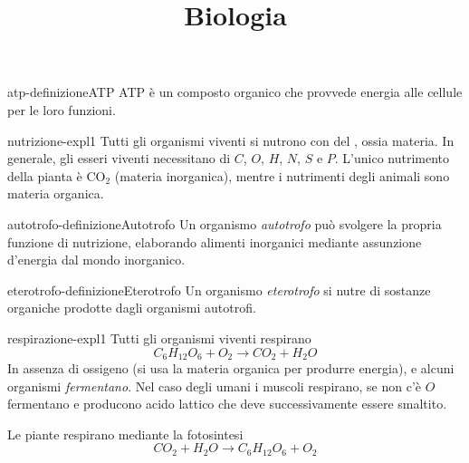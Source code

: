 \documentclass[preview]{standalone}
\begin{document}
\title{Biologia}
\genpage

\begin{snippetdefinition}{atp-definizione}{ATP}
    ATP è un composto organico che provvede energia alle cellule per le loro funzioni.
\end{snippetdefinition}



\begin{snippet}{nutrizione-expl1}
Tutti gli organismi viventi si nutrono con del , ossia materia.
In generale, gli esseri viventi necessitano di \(C\), \(O\), \(H\), \(N\), \(S\) e \(P\).
L'unico nutrimento della pianta è CO\({}_2\) (materia inorganica), mentre
i nutrimenti degli animali sono materia organica.
\end{snippet}

\begin{snippetdefinition}{autotrofo-definizione}{Autotrofo}
    Un organismo \textit{autotrofo} può svolgere la propria funzione di nutrizione,
    elaborando alimenti inorganici mediante assunzione d'energia dal mondo inorganico.
\end{snippetdefinition}

\begin{snippetdefinition}{eterotrofo-definizione}{Eterotrofo}
    Un organismo \textit{eterotrofo}
    si nutre di sostanze organiche prodotte dagli organismi autotrofi.
\end{snippetdefinition}


\begin{snippet}{respirazione-expl1}
Tutti gli organismi viventi respirano
\[
    C_6H_{12}O_6 + O_2 \rightarrow CO_2 + H_2O
\]
In assenza di ossigeno (si usa la materia organica per produrre energia), e alcuni organismi \textit{fermentano}.
Nel caso degli umani i muscoli respirano, se non c'è \(O\) fermentano e producono acido lattico
che deve successivamente essere smaltito.

Le piante respirano mediante la fotosintesi
\[
    CO_2 + H_2O \rightarrow C_6H_{12}O_6 + O_2
\]
\end{snippet}

\end{document}
